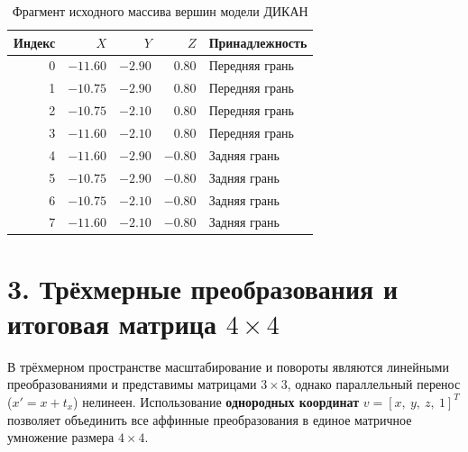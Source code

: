 \documentclass[11pt,a4paper]{article}
\begin{document}
\begin{table}[H]
\centering
\caption{Фрагмент исходного массива вершин модели ДИКАН}
\begin{tabular}{@{}rrrrl@{}}
\toprule
\textbf{Индекс} & \textbf{$X$} & \textbf{$Y$} & \textbf{$Z$} & \textbf{Принадлежность} \\
\midrule
0 & $-11.60$ & $-2.90$ & $0.80$  & Передняя грань \\
1 & $-10.75$ & $-2.90$ & $0.80$  & Передняя грань \\
2 & $-10.75$ & $-2.10$ & $0.80$  & Передняя грань \\
3 & $-11.60$ & $-2.10$ & $0.80$  & Передняя грань \\
4 & $-11.60$ & $-2.90$ & $-0.80$ & Задняя грань \\
5 & $-10.75$ & $-2.90$ & $-0.80$ & Задняя грань \\
6 & $-10.75$ & $-2.10$ & $-0.80$ & Задняя грань \\
7 & $-11.60$ & $-2.10$ & $-0.80$ & Задняя грань \\
\bottomrule
\end{tabular}
\end{table}

\newpage

\section*{3. Трёхмерные преобразования и итоговая матрица $4 \times 4$}
В трёхмерном пространстве масштабирование и повороты являются линейными преобразованиями и представимы матрицами $3 \times 3$, однако параллельный перенос ($x' = x + t_x$) нелинеен. Использование \textbf{однородных координат} $v = [x,\ y,\ z,\ 1]^T$ позволяет объединить все аффинные преобразования в единое матричное умножение размера $4 \times 4$.
\end{document}
